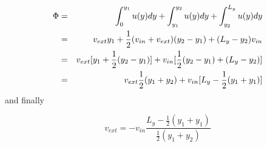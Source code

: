 \begin{eqnarray}
\Phi
&=&\int_{0}^{y_1} u(y) dy  +\int_{y_1}^{y_2} u(y) dy +\int_{y_2}^{L_y} u(y) dy \nonumber\\
&=& v_{ext} y_1  + \frac{1}{2}(v_{in}+v_{ext})(y_2-y_1) + (L_y-y_2) v_{in} \nonumber\\
&=& v_{ext} [y_1 + \frac{1}{2}(y_2-y_1) ] + v_{in} [ \frac{1}{2}(y_2-y_1)  + (L_y-y_2) ] \nonumber\\
&=& v_{ext}\frac{1}{2} (y_1 + y_2 ) + v_{in} [ L_y - \frac{1}{2}(y_1+y_1) ] \nonumber
\end{eqnarray}
and finally
\begin{mdframed}[backgroundcolor=blue!5]
\[
v_{ext} = -v_{in} \frac{ L_y - \frac{1}{2}(y_1+y_1)}{ \frac{1}{2} (y_1 + y_2 ) }
\]
\end{mdframed}

\Literature \cite{ensg82,ditu13}
